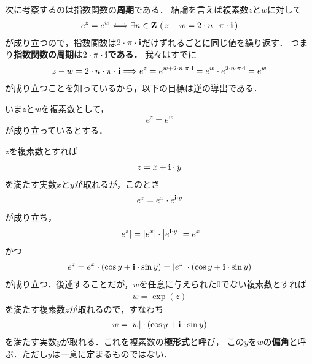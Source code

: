 	次に考察するのは指数関数の{\bf 周期}である．
	結論を言えば複素数$z$と$w$に対して
	\begin{align}
		e^{z} = e^{w} \Longleftrightarrow 
		\exists n \in \mathbf{Z}\, \left(\, z - w = 2 \cdot n \cdot \pi \cdot \mathbf{i}\, \right)
	\end{align}
	が成り立つので，指数関数は$2 \cdot \pi \cdot \mathbf{i}$だけずれるごとに同じ値を繰り返す．
	つまり{\bf 指数関数の周期は$2 \cdot \pi \cdot \mathbf{i}$である．}
	我々はすでに
	\begin{align}
		z - w = 2 \cdot n \cdot \pi \cdot \mathbf{i}
		\Longrightarrow e^{z} = e^{w + 2 \cdot n \cdot \pi \cdot \mathbf{i}}
		= e^{w} \cdot e^{2 \cdot n \cdot \pi \cdot \mathbf{i}}
		= e^{w}
	\end{align}
	が成り立つことを知っているから，以下の目標は逆の導出である．
	
	いま$z$と$w$を複素数として，
	\begin{align}
		e^{z} = e^{w}
	\end{align}
	が成り立っているとする．
	
	$z$を複素数とすれば
	\begin{align}
		z = x + \mathbf{i} \cdot y
	\end{align}
	を満たす実数$x$と$y$が取れるが，このとき
	\begin{align}
		e^z = e^x \cdot e^{\mathbf{i} \cdot y}
	\end{align}
	が成り立ち，
	\begin{align}
		\left|e^z\right| = \left|e^x\right| \cdot \left|e^{\mathbf{i} \cdot y}\right| = e^x
	\end{align}
	かつ
	\begin{align}
		e^z = e^x \cdot (\cos{y} + \mathbf{i} \cdot \sin{y}) = \left|e^z\right| \cdot (\cos{y} + \mathbf{i} \cdot \sin{y})
	\end{align}
	が成り立つ．後述することだが，$w$を任意に与えられた$0$でない複素数とすれば
	\begin{align}
		w = \exp{(z)}
	\end{align}
	を満たす複素数$z$が取れるので，すなわち
	\begin{align}
		w = |w| \cdot (\cos{y} + \mathbf{i} \cdot \sin{y})
	\end{align}
	を満たす実数$y$が取れる．これを複素数の{\bf 極形式}と呼び，
	この$y$を$w$の{\bf 偏角}と呼ぶ．ただし$y$は一意に定まるものではない．
	